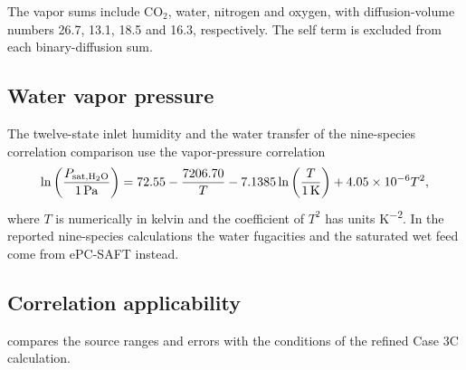 The vapor sums include CO$_2$, water, nitrogen and oxygen, with diffusion-volume numbers 26.7, 13.1, 18.5 and 16.3, respectively.
The self term is excluded from each binary-diffusion sum.

\subsection{Water vapor pressure}
The twelve-state inlet humidity and the water transfer of the nine-species correlation comparison use the vapor-pressure correlation
\begin{equation}
\ln\left(\frac{P_{\mathrm{sat},\HtwoO}}{1\,\mathrm{Pa}}\right)
=72.55-\frac{7206.70}{T}-7.1385\ln\left(\frac{T}{1\,\mathrm K}\right)
+4.05\times10^{-6}T^2,\label{eq:water-vapor-pressure}
\end{equation}
where $T$ is numerically in kelvin and the coefficient of $T^2$ has units \unit{K^{-2}}.
In the reported nine-species calculations the water fugacities and the saturated wet feed come from ePC-SAFT instead.

\subsection{Correlation applicability}\label{sec:appendix-properties}
 compares the source ranges and errors with the conditions of the refined Case 3C calculation.


\clearpage
